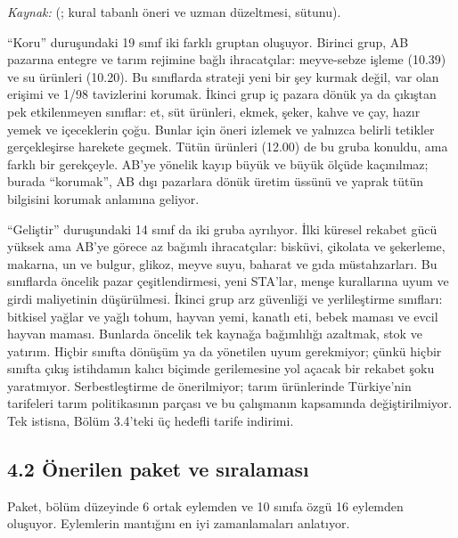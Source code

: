 \endgroup

\emph{Kaynak:}  (; kural tabanlı öneri ve uzman düzeltmesi,  sütunu).

``Koru'' duruşundaki 19 sınıf iki farklı gruptan oluşuyor. Birinci grup, AB pazarına entegre ve tarım rejimine bağlı ihracatçılar: meyve-sebze işleme (10.39) ve su ürünleri (10.20). Bu sınıflarda strateji yeni bir şey kurmak değil, var olan erişimi ve 1/98 tavizlerini korumak. İkinci grup iç pazara dönük ya da çıkıştan pek etkilenmeyen sınıflar: et, süt ürünleri, ekmek, şeker, kahve ve çay, hazır yemek ve içeceklerin çoğu. Bunlar için öneri izlemek ve yalnızca belirli tetikler gerçekleşirse harekete geçmek. Tütün ürünleri (12.00) de bu gruba konuldu, ama farklı bir gerekçeyle. AB'ye yönelik kayıp büyük ve büyük ölçüde kaçınılmaz; burada ``korumak'', AB dışı pazarlara dönük üretim üssünü ve yaprak tütün bilgisini korumak anlamına geliyor.

``Geliştir'' duruşundaki 14 sınıf da iki gruba ayrılıyor. İlki küresel rekabet gücü yüksek ama AB'ye görece az bağımlı ihracatçılar: bisküvi, çikolata ve şekerleme, makarna, un ve bulgur, glikoz, meyve suyu, baharat ve gıda müstahzarları. Bu sınıflarda öncelik pazar çeşitlendirmesi, yeni STA'lar, menşe kurallarına uyum ve girdi maliyetinin düşürülmesi. İkinci grup arz güvenliği ve yerlileştirme sınıfları: bitkisel yağlar ve yağlı tohum, hayvan yemi, kanatlı eti, bebek maması ve evcil hayvan maması. Bunlarda öncelik tek kaynağa bağımlılığı azaltmak, stok ve yatırım. Hiçbir sınıfta dönüşüm ya da yönetilen uyum gerekmiyor; çünkü hiçbir sınıfta çıkış istihdamın kalıcı biçimde gerilemesine yol açacak bir rekabet şoku yaratmıyor. Serbestleştirme de önerilmiyor; tarım ürünlerinde Türkiye'nin tarifeleri tarım politikasının parçası ve bu çalışmanın kapsamında değiştirilmiyor. Tek istisna, Bölüm 3.4'teki üç hedefli tarife indirimi.

\hypertarget{nace_kartlar_10-12-42-uxf6nerilen-paket-ve-sux131ralamasux131}{%
\subsection{4.2 Önerilen paket ve sıralaması}\label{nace_kartlar_10-12-42-uxf6nerilen-paket-ve-sux131ralamasux131}}

Paket, bölüm düzeyinde 6 ortak eylemden ve 10 sınıfa özgü 16 eylemden oluşuyor. Eylemlerin mantığını en iyi zamanlamaları anlatıyor.

